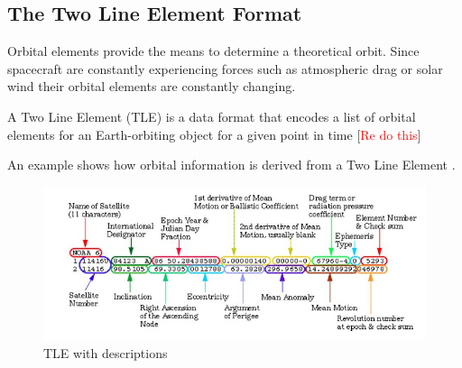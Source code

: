 \documentclass[12pt]{report}
\begin{document}
	
	
	
	\subsection{The Two Line Element Format}
	
	Orbital elements provide the means to determine a theoretical orbit. Since spacecraft are constantly experiencing forces such as atmospheric drag or solar wind their orbital elements are constantly changing. \par 
	A Two Line Element (TLE) is a data format that encodes a list of orbital elements for an Earth-orbiting object for a given point in time [\textcolor{red}{Re do this}]\par
	
	An example shows how orbital information is derived from a Two Line Element \cite{NASATLE}.
	\begin{figure}[h!]
		\centering
		\includegraphics[width=0.7\linewidth]{tle_nasa}
		\caption{TLE with descriptions}
		\label{fig:tlenasa}
	\end{figure}
	
\end{document}
